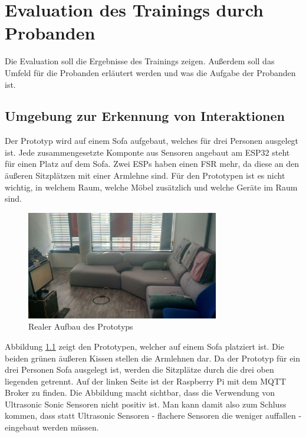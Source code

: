 \chapter{Evaluation des Trainings durch Probanden}
Die Evaluation soll die Ergebnisse des Trainings zeigen. Außerdem soll das Umfeld für die Probanden erläutert werden und was die Aufgabe der Probanden ist.

\section{Umgebung zur Erkennung von Interaktionen}
Der Prototyp wird auf einem Sofa aufgebaut, welches für drei Personen ausgelegt ist. Jede zusammengesetzte Komponte aus Sensoren angebaut am ESP32 steht für einen Platz auf dem Sofa. Zwei ESPs haben einen FSR mehr, da diese an den äußeren Sitzplätzen mit einer Armlehne sind. Für den Prototypen ist es nicht wichtig, in welchem Raum, welche Möbel zusätzlich und welche Geräte im Raum sind.

\begin{figure}[H]
	\centering
		\includegraphics[width=0.75\textwidth]{images/prototyp.jpg}
	\caption{Realer Aufbau des Prototyps}
	\label{fig:prot}
\end{figure}

Abbildung \ref{fig:prot} zeigt den Prototypen, welcher auf einem Sofa platziert ist. Die beiden grünen äußeren Kissen stellen die Armlehnen dar. Da der Prototyp für ein drei Personen Sofa ausgelegt ist, werden die Sitzplätze durch die drei oben liegenden getrennt. Auf der linken Seite ist der Raspberry Pi mit dem MQTT Broker zu finden. Die Abbildung macht sichtbar, dass die Verwendung von Ultrasonic Sonic Sensoren nicht positiv ist. Man kann damit also zum Schluss kommen, dass statt Ultrasonic Sensoren - flachere Sensoren die weniger auffallen - eingebaut werden müssen.


